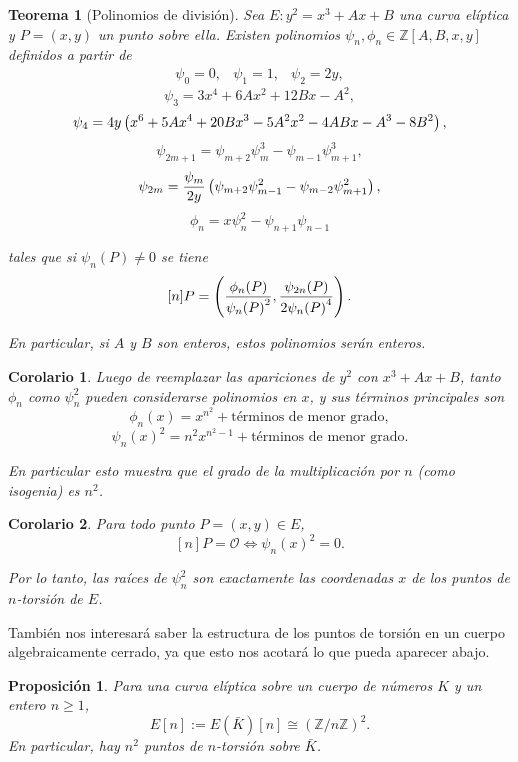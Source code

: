 \documentclass[a4paper]{book}
\theoremstyle{definition}
\theoremstyle{plain}
\newtheorem*{theorem*}{Teorema}
\newtheorem{prop}[definition]{Proposición}
\newtheorem*{corollary*}{Corolario}
\newcommand{\ZZ}{\mathbb{Z}}
\newcommand{\OO}{\mathcal{O}}
\newcommand{\lp}{\left\lparen}
\newcommand{\rp}{\right\rparen}
\begin{document}
\begin{theorem*}[Polinomios de división]
Sea $E:y^2=x^3+Ax+B$ una curva elíptica y $P=(x,y)$ un punto sobre ella. Existen polinomios $\psi_n , \phi_n \in\ZZ[A,B,x,y]$ definidos a partir de 
\[ 
\begin{array}{ccc}
\psi_0=0, & \psi_1=1, & \psi_2=2y, 
\end{array}
\] 
\[ \psi_3=3x^4+6Ax^2+12Bx-A^2, \] 
\[ \psi_4= 4y\lp x^6+5Ax^4+20Bx^3-5A^2x^2-4ABx-A^3-8B^2 \rp, \] 
\[ \psi_{2m+1} = \psi_{m+2}\psi_m^3-\psi_{m-1}\psi_{m+1}^3, \] 
\[ \psi_{2m} = \frac{\psi_m}{2y} \lp \psi_{m+2}\psi_{m-1}^2-\psi_{m-2}\psi_{m+1}^2 \rp, \] 
\[ \phi_n=x\psi_n^2-\psi_{n+1}\psi_{n-1} \] 

tales que si $\psi_n(P)\neq0$ se tiene 
\[ 
[n]P= \lp \frac{\phi_n(P)}{{\psi_n(P)}^2}, \frac{\psi_{2n}(P)}{2{\psi_n(P)}^4} \rp. 
\] 

En particular, si $A$ y $B$ son enteros, estos polinomios serán enteros.
\end{theorem*} 

\begin{corollary*}
Luego de reemplazar las apariciones de $y^2$ con $x^3+Ax+B$, tanto $\phi_n$ como $\psi_n^2$ pueden considerarse polinomios en $x$, y sus términos principales son 
\[ \phi_n(x)=x^{n^2}+\text{términos de menor grado}, \] 
\[ {\psi_n(x)}^2=n^2x^{n^2-1}+\text{términos de menor grado}. \] 

En particular esto muestra que el grado de la multiplicación por $n$ (como isogenia) es $n^2$.
\end{corollary*} 

\begin{corollary*}
Para todo punto $P=(x,y)\in E$, 
\[ 
[n]P=\OO \Longleftrightarrow {\psi_n(x)}^2=0. 
\] 

Por lo tanto, las raíces de $\psi_n^2$ son exactamente las coordenadas $x$ de los puntos de $n$-torsión de $E$.
\end{corollary*}

También nos interesará saber la estructura de los puntos de torsión en un cuerpo algebraicamente cerrado, ya que esto nos acotará lo que pueda aparecer abajo.

\begin{prop}\label{prop:torsionEnC}
Para una curva elíptica sobre un cuerpo de números $K$ y un entero $n\geq1$,
\[
E[n]:=E(\bar{K})[n] \cong {(\ZZ/n\ZZ)}^2.
\]
En particular, hay $n^2$ puntos de $n$-torsión sobre $\bar{K}$.
\end{prop}
\end{document}
